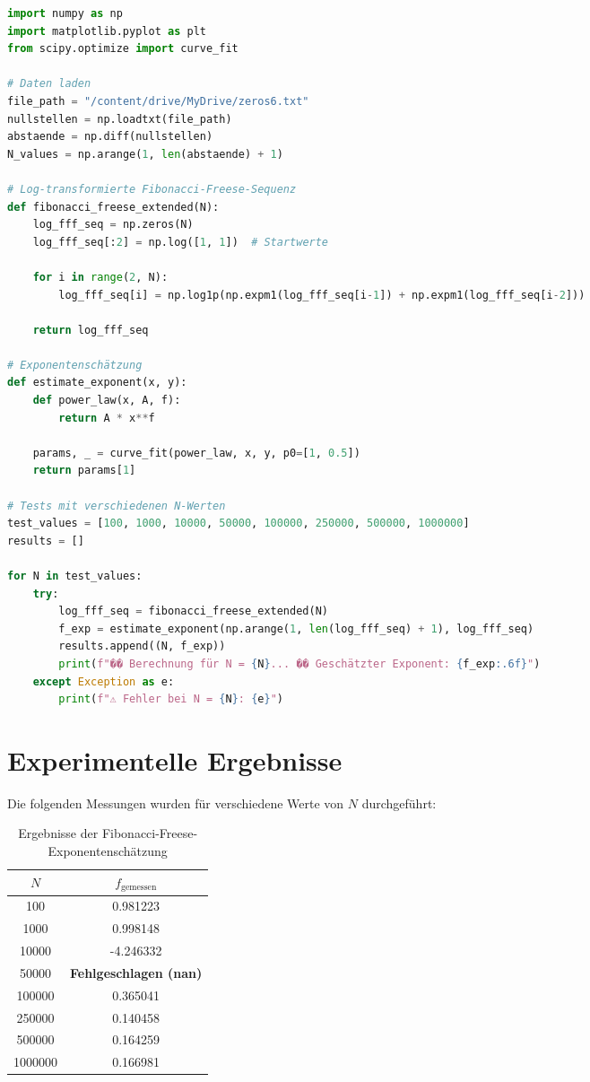 \documentclass[a4paper,12pt]{article}
\begin{document}
\begin{lstlisting}[language=Python, basicstyle=\ttfamily\small, breaklines=true]
import numpy as np
import matplotlib.pyplot as plt
from scipy.optimize import curve_fit

# Daten laden
file_path = "/content/drive/MyDrive/zeros6.txt"
nullstellen = np.loadtxt(file_path)
abstaende = np.diff(nullstellen)
N_values = np.arange(1, len(abstaende) + 1)

# Log-transformierte Fibonacci-Freese-Sequenz
def fibonacci_freese_extended(N):
    log_fff_seq = np.zeros(N)
    log_fff_seq[:2] = np.log([1, 1])  # Startwerte

    for i in range(2, N):
        log_fff_seq[i] = np.log1p(np.expm1(log_fff_seq[i-1]) + np.expm1(log_fff_seq[i-2]))

    return log_fff_seq

# Exponentenschätzung
def estimate_exponent(x, y):
    def power_law(x, A, f):
        return A * x**f

    params, _ = curve_fit(power_law, x, y, p0=[1, 0.5])
    return params[1]

# Tests mit verschiedenen N-Werten
test_values = [100, 1000, 10000, 50000, 100000, 250000, 500000, 1000000]
results = []

for N in test_values:
    try:
        log_fff_seq = fibonacci_freese_extended(N)
        f_exp = estimate_exponent(np.arange(1, len(log_fff_seq) + 1), log_fff_seq)
        results.append((N, f_exp))
        print(f"�� Berechnung für N = {N}... �� Geschätzter Exponent: {f_exp:.6f}")
    except Exception as e:
        print(f"⚠️ Fehler bei N = {N}: {e}")
\end{lstlisting}

\section{Experimentelle Ergebnisse}

Die folgenden Messungen wurden für verschiedene Werte von \( N \) durchgeführt:

\begin{table}[h!]
\centering
\begin{tabular}{|c|c|}
\hline
\( N \) & \( f_{\text{gemessen}} \) \\
\hline
100 & 0.981223 \\
1000 & 0.998148 \\
10000 & -4.246332 \\
50000 & \textbf{Fehlgeschlagen (nan)} \\
100000 & 0.365041 \\
250000 & 0.140458 \\
500000 & 0.164259 \\
1000000 & 0.166981 \\
\hline
\end{tabular}
\caption{Ergebnisse der Fibonacci-Freese-Exponentenschätzung}
\end{table}
\end{document}
